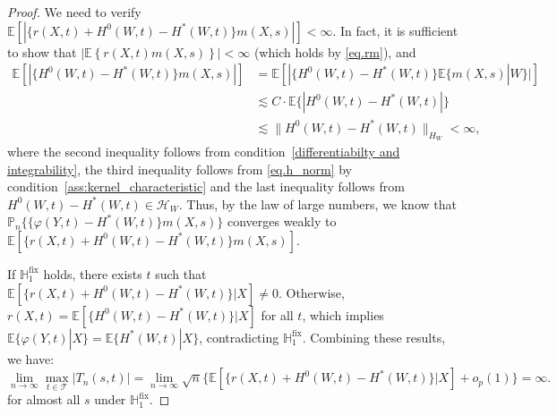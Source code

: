 \documentclass[
  12pt]{article}
\def\mE{\mathbb{E}}
\def\mH{\mathbb{H}}
\def\cH{\mathcal{H}}
\def\cT{\mathcal{T}}
\def\mE{\mathbb{E}}
\begin{document}
\begin{proof}
We need to verify $\mE[|\{r(X,t) +H^0(W,t)-H^*(W,t)\}m(X,s)|]<\infty$. In fact, it is sufficient to show that $|\mathbb{E} \left\{r(X,t) m(X,s)\right\}|<\infty$ (which holds by \eqref{eq.rm}), and
$$
\begin{aligned}
	\mathbb{E} [ |\{H^0(W,t)-H^*(W,t)\}m(X,s)|] &=\mathbb{E} [| \{H^0(W,t)-H^*(W,t)\}\mathbb{E} \{m(X,s)|W\} |]\\
	&\lesssim C\cdot \mathbb{E} \{|H^0(W,t)-H^*(W,t)|\}\\
	&\lesssim  \|H^0(W,t)-H^*(W,t)\|_{H_W}<\infty,
\end{aligned}
$$
where the second inequality follows from condition~\ref{differentiabilty and integrability}, the third inequality follows from \eqref{eq.h_norm} by condition~\ref{ass:kernel_characteristic} and the last inequality follows from $H^0(W,t)-H^*(W,t)\in \cH_W$. Thus, by the law of large numbers, we know that $\mathbb{P}_n\{ \{\varphi (Y,t)-H^*(W,t)\}m(X,s) \}$ converges weakly to $\mE[ \{r(X,t) +H^0(W,t)-H^*(W,t)\}m(X,s)]$.

If $\mH_1^{\mathrm{fix}}$ holds, there exists $t$ such that $\mathbb{E}[ \{r(X,t) +H^0(W,t)-H^*(W,t)\}|X]\neq0$.
Otherwise, $r(X,t)=\mE[ \{H^0(W,t)-H^*(W,t)\}|X]$ for all $t$, which implies $\mE\{ \varphi ( Y,t)|X \}=\mE\{ H^*( W,t )|X \}$, contradicting $\mH_1^{\mathrm{fix}}$. Combining these results, we have:
$$
\lim_{n\rightarrow \infty} \max_{t\in \cT} |T_n(s,t)|=\lim_{n\rightarrow \infty} \sqrt{n}\{ \mathbb{E}\left[ \{r(X,t) +H^0(W,t)-H^*(W,t)\}|X\right] +o_p(1)\} =\infty.
$$ 
for almost all $s$ under $\mH_1^{\mathrm{fix}}$.
\end{proof}
\end{document}
